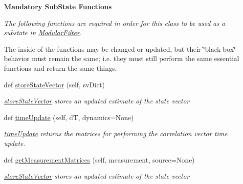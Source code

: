 \begin{Indent}{\bf Mandatory Sub\+State Functions}\par
{\em The following functions are required in order for this class to be used as a substate in \hyperlink{namespacemodest_1_1ModularFilter}{Modular\+Filter}.

The inside of the functions may be changed or updated, but their \char`\"{}black box\char`\"{} behavior must remain the same; i.\+e. they must still perform the same essential functions and return the same things. }\begin{DoxyCompactItemize}
\item 
def \hyperlink{classmodest_1_1substates_1_1correlationvector_1_1CorrelationVector_a70ed47697f09424e62e52133fdfb59de}{store\+State\+Vector} (self, sv\+Dict)
\begin{DoxyCompactList}\small\item\em \hyperlink{classmodest_1_1substates_1_1correlationvector_1_1CorrelationVector_a70ed47697f09424e62e52133fdfb59de}{store\+State\+Vector} stores an updated estimate of the state vector \end{DoxyCompactList}\item 
def \hyperlink{classmodest_1_1substates_1_1correlationvector_1_1CorrelationVector_a59c13e5fa26ba27717494f687ec78ef8}{time\+Update} (self, dT, dynamics=None)
\begin{DoxyCompactList}\small\item\em \hyperlink{classmodest_1_1substates_1_1correlationvector_1_1CorrelationVector_a59c13e5fa26ba27717494f687ec78ef8}{time\+Update} returns the matrices for performing the correlation vector time update. \end{DoxyCompactList}\item 
def \hyperlink{classmodest_1_1substates_1_1correlationvector_1_1CorrelationVector_a2fb13d8c6fffa49ee641dd918a64db4b}{get\+Measurement\+Matrices} (self, measurement, source=None)
\begin{DoxyCompactList}\small\item\em \hyperlink{classmodest_1_1substates_1_1correlationvector_1_1CorrelationVector_a70ed47697f09424e62e52133fdfb59de}{store\+State\+Vector} stores an updated estimate of the state vector \end{DoxyCompactList}\end{DoxyCompactItemize}
\end{Indent}
